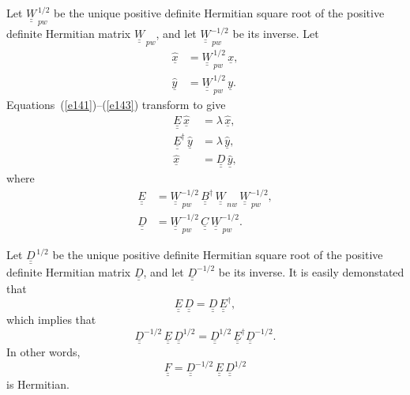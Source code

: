 \documentclass[12pt,prb,aps,notitlepage]{revtex4-1}
\begin{document}
Let $\underline{\underline{W}}_{\,pw}^{\,1/2}$ be the unique positive definite Hermitian square root of the positive definite Hermitian
matrix $\underline{\underline{W}}_{\,pw}$, and let $\underline{\underline{W}}_{\,pw}^{-1/2}$ be its inverse. 
Let
\begin{align}
\underline{\hat{x}}&= \underline{\underline{W}}_{\,pw}^{\,1/2}\,\underline{x},\\[0.5ex]
\underline{\hat{y}}&= \underline{\underline{W}}_{\,pw}^{\,1/2}\,\underline{y}.
\end{align}
Equations~(\ref{e141})--(\ref{e143}) transform to give
\begin{align}\label{e106t}
\underline{\underline{E}}\,\underline{\hat{x}} &= \lambda\,\underline{\hat{x}},\\[0.5ex]
\underline{\underline{E}}^\dag\,\underline{\hat{y}} &= \lambda\,\underline{\hat{y}},\\[0.5ex]
\underline{\hat{x}} &= \underline{\underline{D}}\,\underline{\hat{y}},\label{e108t}
\end{align}
where
\begin{align}
\underline{\underline{E}} &= \underline{\underline{W}}_{\,pw}^{-1/2}\,\underline{\underline{B}}^\dag\,\underline{\underline{W}}_{\,nw}\, \underline{\underline{W}}_{\,pw}^{-1/2},\\[0.5ex]
\underline{\underline{D}} &=  \underline{\underline{W}}_{\,pw}^{-1/2} \,\underline{\underline{C}} \,\underline{\underline{W}}_{\,pw}^{-1/2}.
\end{align}

Let $\underline{\underline{D}}^{\,1/2}$ be the unique positive definite Hermitian square root of the positive definite Hermitian
matrix $\underline{\underline{D}}$, and let $\underline{\underline{D}}^{-1/2}$ be its inverse. It is easily demonstated
that
\begin{equation}
\underline{\underline{E}}\,\underline{\underline{D}}= \underline{\underline{D}}\,\underline{\underline{E}}^\dag,
\end{equation}
which implies that
\begin{equation}
\underline{\underline{D}}^{-1/2}\,\underline{\underline{E}}\,\underline{\underline{D}}^{1/2}= \underline{\underline{D}}^{1/2}\,\underline{\underline{E}}^\dag\underline{\underline{D}}^{-1/2}.
\end{equation}
In other words,
\begin{equation}
\underline{\underline{F}}=\underline{\underline{D}}^{-1/2}\,\underline{\underline{E}}\,\underline{\underline{D}}^{1/2}
\end{equation}
is Hermitian. 
\end{document}

